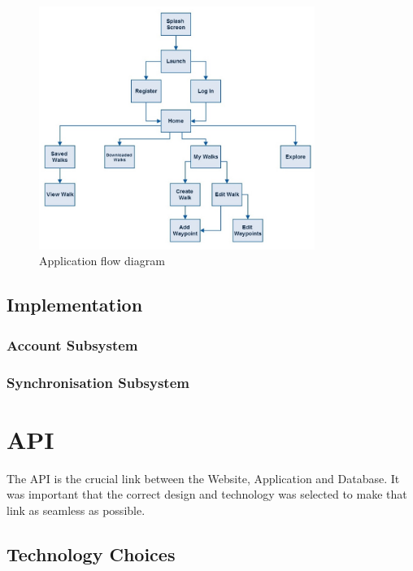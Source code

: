 \documentclass[11pt,a4paper]{report}
\begin{document}
\begin{figure}[H]
    \centering
    \includegraphics[width=0.8\textwidth]{chris/flow}
    \caption{Application flow diagram}
    \label{fig:flow}
\end{figure}

\subsection{Implementation}
\subsubsection{Account Subsystem}
\subsubsection{Synchronisation Subsystem}


\section{API} 
\label{sec:api-design}

The API is the crucial link between the Website, Application and Database. It was important that the correct design and technology was selected to make that link as seamless as possible. 

\subsection{Technology Choices}
\label{sec:api:techChoices}
\end{document}
